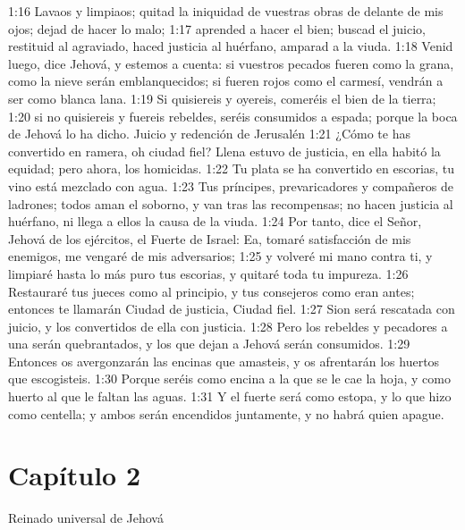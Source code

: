 1:16 Lavaos y limpiaos; quitad la iniquidad de vuestras obras de delante de mis ojos; dejad de hacer lo malo; 
1:17 aprended a hacer el bien; buscad el juicio, restituid al agraviado, haced justicia al huérfano, amparad a la viuda. 
1:18 Venid luego, dice Jehová, y estemos a cuenta: si vuestros pecados fueren como la grana, como la nieve serán emblanquecidos; si fueren rojos como el carmesí, vendrán a ser como blanca lana. 
1:19 Si quisiereis y oyereis, comeréis el bien de la tierra; 
1:20 si no quisiereis y fuereis rebeldes, seréis consumidos a espada; porque la boca de Jehová lo ha dicho. 
Juicio y redención de Jerusalén 
1:21 ¿Cómo te has convertido en ramera, oh ciudad fiel? Llena estuvo de justicia, en ella habitó la equidad; pero ahora, los homicidas. 
1:22 Tu plata se ha convertido en escorias, tu vino está mezclado con agua. 
1:23 Tus príncipes, prevaricadores y compañeros de ladrones; todos aman el soborno, y van tras las recompensas; no hacen justicia al huérfano, ni llega a ellos la causa de la viuda. 
1:24 Por tanto, dice el Señor, Jehová de los ejércitos, el Fuerte de Israel: Ea, tomaré satisfacción de mis enemigos, me vengaré de mis adversarios; 
1:25 y volveré mi mano contra ti, y limpiaré hasta lo más puro tus escorias, y quitaré toda tu impureza. 
1:26 Restauraré tus jueces como al principio, y tus consejeros como eran antes; entonces te llamarán Ciudad de justicia, Ciudad fiel. 
1:27 Sion será rescatada con juicio, y los convertidos de ella con justicia. 
1:28 Pero los rebeldes y pecadores a una serán quebrantados, y los que dejan a Jehová serán consumidos. 
1:29 Entonces os avergonzarán las encinas que amasteis, y os afrentarán los huertos que escogisteis. 
1:30 Porque seréis como encina a la que se le cae la hoja, y como huerto al que le faltan las aguas. 
1:31 Y el fuerte será como estopa, y lo que hizo como centella; y ambos serán encendidos juntamente, y no habrá quien apague. 
\section*{Capítulo 2}
Reinado universal de Jehová 

